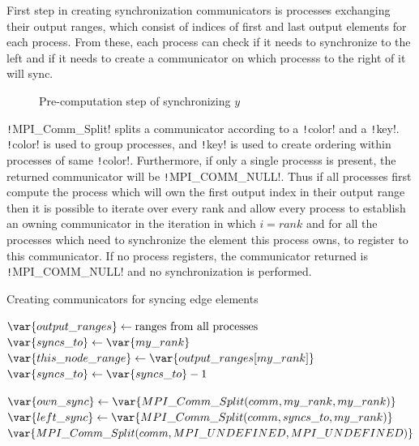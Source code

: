 \documentclass[thesis=M,english]{FITthesis}[2019/12/23]
\newcommand{\csre}[1]{\texttt!#1!}
\begin{document}
First step in creating synchronization communicators is processes exchanging their output ranges,
which consist of indices of first and last output elements for each process. From
these, each process can check if it needs to synchronize to the left and if it needs to
create a communicator on which processs to the right of it will sync.

\begin{figure}[htp]
    \centering
    \caption{Pre-computation step of synchronizing \(y\)}
\end{figure}

\csre{MPI_Comm_Split} splits a communicator according to a \csre{color} and a \csre{key}.
\csre{color} is used to group processes, and \csre{key} is used to create ordering within processes
of same \csre{color}. Furthermore, if only a single processs is present, the
returned communicator will be \csre{MPI_COMM_NULL}. Thus if all processes first compute the
process which will own the first output index in their output range then it is possible
to iterate over every rank and allow every process to establish an owning communicator
in the iteration in which \(i = rank\) and for all the processes which need to synchronize
the element this process owns, to register to this communicator. If no process registers,
the communicator returned is \csre{MPI_COMM_NULL} and no
synchronization is performed.

\begin{algorithm}[htp]
    \caption{Creating communicators for syncing edge elements}
    \begin{algorithmic}
        \State $\var{output\_ranges} \gets \text{ranges from all processes}$
        \State $\var{syncs\_to} \gets \var{my\_rank}$
        \State $\var{this\_node\_range} \gets \var{output\_ranges[my\_rank]}$
        \State $\var{syncs\_to} \gets \var{syncs\_to} - 1$
        \EndWhile

        \State $\var{own\_sync} \gets \var{MPI\_Comm\_Split(comm, my\_rank, my\_rank)}$
        \State $\var{left\_sync} \gets \var{MPI\_Comm\_Split(comm, syncs\_to, my\_rank)}$
        \Else {}
        \State $\var{MPI\_Comm\_Split(comm, MPI\_UNDEFINED, MPI\_UNDEFINED)}$
        \EndIf
        \EndFor
        \EndFunction
    \end{algorithmic}
\end{algorithm}
\end{document}
